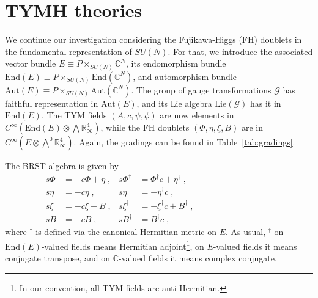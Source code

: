 \documentclass[../main.tex]{subfiles}
\begin{document}
\section{TYMH theories}%
\label{sec:fundamental}

We continue our investigation considering the Fujikawa-Higgs (FH) doublets in the fundamental representation of $SU(N)$. For that, we introduce the associated vector bundle $E \equiv P \times_{SU(N)} \mathbb{C}^N$, its endomorphism bundle $\mathrm{End}(E) \equiv P \times_{SU(N)} \mathrm{End}(\mathbb{C}^N)$, and automorphism bundle $\mathrm{Aut}(E) \equiv P \times_{SU(N)} \mathrm{Aut}(\mathbb{C}^N)$. The group of gauge transformations $\mathcal{G}$ has faithful representation in $\mathrm{Aut}(E)$, and its Lie algebra $\mathrm{Lie(\mathcal{G})}$ has it in $\mathrm{End}(E)$. The TYM fields $(A, c, \psi, \phi)$ are now elements in $C^{\infty}(\mathrm{End}(E) \otimes \bigwedge \mathbb{R}^4_{\infty} )$, while the FH doublets $(\Phi, \eta, \xi, B)$ are in $ C^{\infty}(E \otimes \bigwedge^0 \mathbb{R}^4_{\infty} )$. Again, the gradings can be found in Table~\ref{tab:gradings}.

The BRST algebra is given by
\begin{subequations}%
  \label{eq:ffh-fields}
  \begin{align}
    s \Phi & = - c \Phi + \eta \;, & s \Phi^{\dagger} & = \Phi^{\dagger} c + \eta^{\dagger} \;,            & \hspace{100pt} \\
    s \eta & = - c \eta  \;,       & s \eta^{\dagger} & =  - \eta^{\dagger} c                 \;,          & \hspace{100pt} \\
    s \xi  & = - c \xi + B \;,     & s \xi^{\dagger}  & = - \xi^{\dagger} c + B^{\dagger}              \;, & \hspace{100pt} \\
    s B    & = - c B  \;,          & s B^{\dagger}    & = B^{\dagger} c                  \;,               & \hspace{100pt}
  \end{align}
\end{subequations}
where ${}^{\dagger}$ is defined via the canonical Hermitian metric on $E$. As usual, ${}^{\dagger}$ on $\mathrm{End}(E)$-valued fields means Hermitian adjoint\footnote{In our convention, all TYM fields are anti-Hermitian.}, on $E$-valued fields it means conjugate transpose, and on $\mathbb{C}$-valued fields it means complex conjugate.
\end{document}
